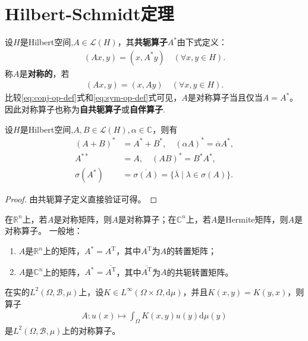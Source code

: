 \documentclass[../../main.tex]{subfiles}%
\begin{document}
\section{Hilbert-Schmidt定理}

\begin{definition}
设$H$是Hilbert空间,$A\in\mathscr{L}(H)$，其\textbf{共轭算子}$A^*$由下式定义：
\begin{align}
(Ax,y)=(x,A^*y)\quad(\forall x,y\in H).\label{eq:conj-op-def}
\end{align}
称$A$是\textbf{对称的}，若
\begin{align}
(Ax,y)=(x,Ay)\quad(\forall x,y\in H).\label{eq:sym-op-def}
\end{align}
比较\eqref{eq:conj-op-def}式和\eqref{eq:sym-op-def}式可见，$A$是对称算子当且仅当$A=A^*$。因此对称算子也称为\textbf{自共轭算子}或\textbf{自伴算子}.
\end{definition}

\begin{proposition}
设$H$是Hilbert空间,$A,B\in\mathscr{L}(H),\alpha\in\mathbb{C}$，则有
\begin{align*}
(A+B)^*&=A^*+B^*,\quad (\alpha A)^*=\overline{\alpha}A^*,\\
A^{**}&=A,\quad (AB)^*=B^*A^*,\\
\sigma(A^*)&=\overline{\sigma(A)}=\{\overline{\lambda}\mid\lambda\in\sigma(A)\}.
\end{align*}
\end{proposition}
\begin{proof}

由共轭算子定义直接验证可得。

\end{proof}

\begin{examples}
在$\mathbb{R}^n$上，若$A$是对称矩阵，则$A$是对称算子；在$\mathbb{C}^n$上，若$A$是Hermite矩阵，则$A$是对称算子。
一般地：
\begin{enumerate}[(1)]
\item $A$是$\mathbb{R}^n$上的矩阵，$A^*=A^\mathrm{T}$，其中$A^\mathrm{T}$为$A$的转置矩阵；

\item $A$是$\mathbb{C}^n$上的矩阵，$A^*=\overline{A^\mathrm{T}}$，其中$\overline{A^\mathrm{T}}$为$A$的共轭转置矩阵。
\end{enumerate}
\end{examples}

\begin{examples}
在实的$L^2(\Omega,\mathscr{B},\mu)$上，设$K\in L^\infty(\Omega\times\Omega,\mathrm{d}\mu)$，并且$K(x,y)=K(y,x)$，则算子
\begin{align*}
A:u(x)\mapsto\int_{\Omega}K(x,y)u(y)\mathrm{d}\mu(y)
\end{align*}
是$L^2(\Omega,\mathscr{B},\mu)$上的对称算子。
\end{examples}
\end{document}
